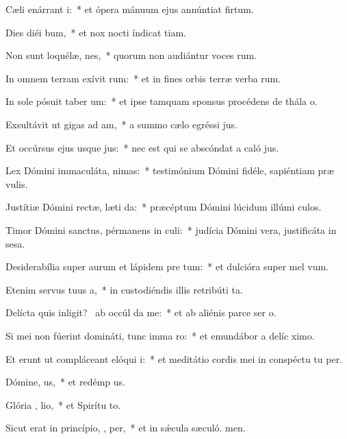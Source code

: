 \item Cæli enárrant  i:~* et ópera mánuum ejus annúntiat firtum.
\item Dies diéi  bum,~* et nox nocti índicat tiam.
\item Non sunt loquélæ,  nes,~* quorum non audiántur voces rum.
\item In omnem terram exívit  rum:~* et in fines orbis terræ verba rum.
\item In sole pósuit taber um:~* et ipse tamquam sponsus procédens de thála o.
\item Exsultávit ut gigas ad  am,~* a summo cælo egréssi jus.
\item Et occúrsus ejus usque   jus:~* nec est qui se abscóndat a caló jus.
\item Lex Dómini immaculáta,  nimas:~* testimónium Dómini fidéle, sapiéntiam præ vulis.
\item Justítiæ Dómini rectæ, læti da:~* præcéptum Dómini lúcidum illúmi culos.
\item Timor Dómini sanctus, pérmanens in  culi:~* judícia Dómini vera, justificáta in sesa.
\item Desiderabília super aurum et lápidem pre tum:~* et dulcióra super mel  vum.
\item Etenim servus tuus  a,~* in custodiéndis illis retribúti ta.
\item Delícta quis inligit?~\pscross{} ab occúl  da me:~* et ab aliénis parce ser o.
\item Si mei non fúerint domináti, tunc imma ro:~* et emundábor a delíc ximo.
\item Et erunt ut compláceant elóqui  i:~* et meditátio cordis mei in conspéctu tu per.
\item Dómine,  us,~* et redémp us.
\item Glória ,  lio,~* et Spirítu to.
\item Sicut erat in princípio,  ,  per,~* et in sǽcula sæculó. men.
